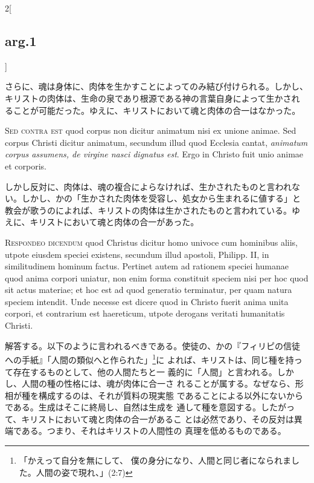\documentclass[paper=a4paper,fontsize=10pt,jafontsize=9pt,titlepage]{jlreq}
\begin{document}
\begin{paracol}{2}[\subsection{arg.1}]
\switchcolumn

さらに、魂は身体に、肉体を生かすことによってのみ結び付けられる。しかし、
キリストの肉体は、生命の泉であり根源である神の言葉自身によって生かされ
ることが可能だった。ゆえに、キリストにおいて魂と肉体の合一はなかった。

\switchcolumn*[\subsection{s.c.}]

{\scshape Sed contra est} quod corpus non dicitur animatum nisi ex
unione animae. Sed corpus Christi dicitur animatum, secundum illud
quod Ecclesia cantat, {\itshape animatum corpus assumens, de virgine
nasci dignatus est}. Ergo in Christo fuit unio animae et corporis.

\switchcolumn

しかし反対に、肉体は、魂の複合によらなければ、生かされたものと言われな
い。しかし、かの「生かされた肉体を受容し、処女から生まれるに値する」と
教会が歌うのによれば、キリストの肉体は生かされたものと言われている。ゆ
えに、キリストにおいて魂と肉体の合一があった。


{\scshape Respondeo dicendum} quod Christus dicitur homo univoce cum
hominibus aliis, utpote eiusdem speciei existens, secundum illud
apostoli, Philipp. II, in similitudinem hominum factus. Pertinet autem
ad rationem speciei humanae quod anima corpori uniatur, non enim forma
constituit speciem nisi per hoc quod sit actus materiae; et hoc est ad
quod generatio terminatur, per quam natura speciem intendit. Unde
necesse est dicere quod in Christo fuerit anima unita corpori, et
contrarium est haereticum, utpote derogans veritati humanitatis
Christi.

\switchcolumn

解答する。以下のように言われるべきである。使徒の、かの『フィリピの信徒
への手紙』「人間の類似へと作られた」\footnote{「かえって自分を無にして、
僕の身分になり、人間と同じ者になられました。人間の姿で現れ、」(2:7)}に
よれば、キリストは、同じ種を持って存在するものとして、他の人間たちと一
義的に「人間」と言われる。しかし、人間の種の性格には、魂が肉体に合一さ
れることが属する。なぜなら、形相が種を構成するのは、それが質料の現実態
であることによる以外にないからである。生成はそこに終局し、自然は生成を
通して種を意図する。したがって、キリストにおいて魂と肉体の合一があるこ
とは必然であり、その反対は異端である。つまり、それはキリストの人間性の
真理を低めるものである。


\end{paracol}
\end{document}
